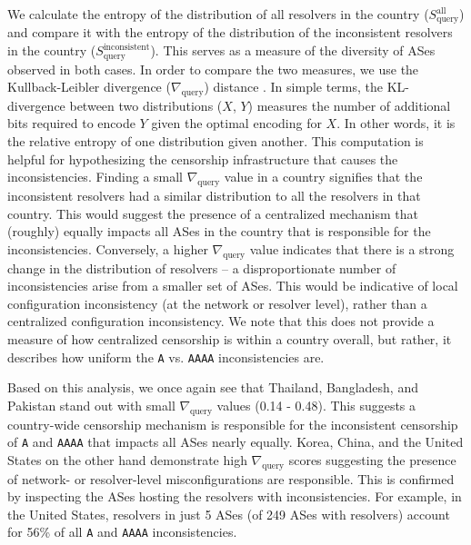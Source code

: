 We calculate the entropy of the distribution of all resolvers in the
country ($S_{\text{query}}^{\text{all}}$) and compare it with the entropy of
the distribution of the inconsistent resolvers in the country
($S_{\text{query}}^{\text{inconsistent}}$). This serves as a measure of the
diversity of ASes observed in both cases. 
%
In order to compare the two measures, we use the Kullback-Leibler divergence
($\nabla_{\text{query}}$) distance \cite{KLdivergence}. In simple terms, the
KL-divergence between two distributions ($X$, $Y$) measures the number
of additional bits required to encode $Y$ given the optimal encoding for $X$. In
other words, it is the relative entropy of one distribution given another. 
%
This computation is helpful for hypothesizing the censorship infrastructure
that causes the inconsistencies. Finding a small $\nabla_{\text{query}}$ value
in a country signifies that the inconsistent resolvers had a similar
distribution to all the resolvers in that country. This would suggest the
presence of a centralized mechanism that (roughly) equally impacts all ASes in
the country that is responsible for the inconsistencies.
Conversely, a higher $\nabla_{\text{query}}$ value indicates that there is
a strong change in the distribution of resolvers -- \ie a disproportionate
number of inconsistencies arise from a smaller set of ASes. This would be
indicative of local configuration inconsistency (at the network or resolver
level), rather than a centralized configuration inconsistency.
%
We note that this does not provide a measure of how centralized censorship is
within a country overall, but rather, it describes how uniform the {\tt A} vs.
{\tt AAAA} inconsistencies are.

%
Based on this analysis, we once again see that Thailand, Bangladesh, and
Pakistan stand out with small $\nabla_{\text{query}}$ values (0.14 - 0.48).
This suggests a country-wide censorship mechanism is responsible
for the inconsistent censorship of {\tt A} and {\tt AAAA} that impacts all
ASes nearly equally.
%
Korea, China, and the United States on the other hand demonstrate high
$\nabla_{\text{query}}$ scores suggesting the presence of network- or
resolver-level misconfigurations are responsible. This is confirmed by inspecting the ASes
hosting the resolvers with inconsistencies. For example, in the United States,
resolvers in just 5 ASes (of 249 ASes with resolvers) account for 56\% of all
{\tt A} and {\tt AAAA} inconsistencies.



